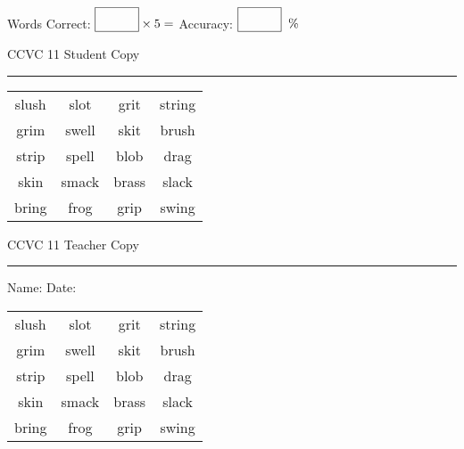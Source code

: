 \documentclass{memoir}
\begin{document}
\small

Words Correct: $\fbox{\phantom{\huge 100}} \times 5 = $ Accuracy: $\fbox{\phantom{\huge 100}}\;\; \%$ 

\vfill

\newpage


\footnotesize \noindent
CCVC 11 \hfill Student Copy
\smallskip
\hrule

\Large

\setlength{\tabcolsep}{14pt}
\def\arraystretch{3}

{\selectfont


\begin{vplace}[0.5]
\begin{center}
\begin{tabular}{cccc}
slush & slot & grit      & string \\
grim       & swell & skit & brush \\
strip & spell & blob & drag        \\
skin & smack & brass       & slack            \\
bring      & frog & grip      & swing \\
\end{tabular}
\end{center}
\end{vplace}

}

\newpage

\footnotesize \noindent
CCVC 11 \hfill Teacher Copy
\smallskip
\hrule

\small

\vfill

\noindent
Name: \underline{\hspace{1.75in}} \hfill Date: \underline{\hspace{1in}}

\Large

{\selectfont


\begin{vplace}[0.5]
\begin{center}
\begin{tabular}{cccc}
slush & slot & grit      & string \\
grim       & swell & skit & brush \\
strip & spell & blob & drag        \\
skin & smack & brass       & slack            \\
bring      & frog & grip      & swing \\
\end{tabular}
\end{center}
\end{vplace}



}
\end{document}

